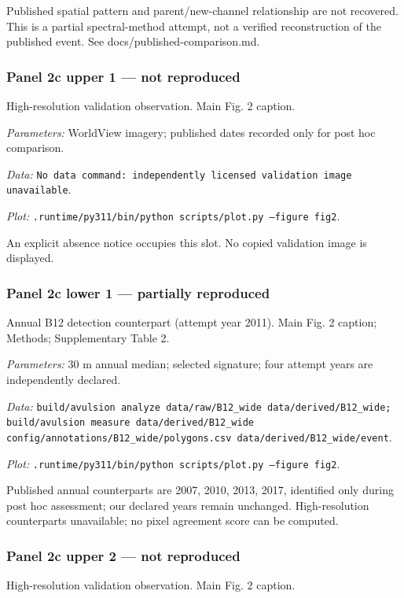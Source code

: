 Published spatial pattern and parent/new-channel relationship are not recovered. This is a partial spectral-method attempt, not a verified reconstruction of the published event. See docs/published-comparison.md.

\subsubsection*{Panel 2c upper 1 --- not reproduced}
High-resolution validation observation. Main Fig. 2 caption.

\textit{Parameters:} WorldView imagery; published dates recorded only for post hoc comparison.

\textit{Data:} \texttt{No data command: independently licensed validation image unavailable}.

\textit{Plot:} \texttt{.runtime/\allowbreak{}py311/\allowbreak{}bin/\allowbreak{}python scripts/\allowbreak{}plot.py --figure fig2}.

An explicit absence notice occupies this slot. No copied validation image is displayed.

\subsubsection*{Panel 2c lower 1 --- partially reproduced}
Annual B12 detection counterpart (attempt year 2011). Main Fig. 2 caption; Methods; Supplementary Table 2.

\textit{Parameters:} 30 m annual median; selected signature; four attempt years are independently declared.

\textit{Data:} \texttt{build/\allowbreak{}avulsion analyze data/\allowbreak{}raw/\allowbreak{}B12\_wide data/\allowbreak{}derived/\allowbreak{}B12\_wide; build/\allowbreak{}avulsion measure data/\allowbreak{}derived/\allowbreak{}B12\_wide config/\allowbreak{}annotations/\allowbreak{}B12\_wide/\allowbreak{}polygons.csv data/\allowbreak{}derived/\allowbreak{}B12\_wide/\allowbreak{}event}.

\textit{Plot:} \texttt{.runtime/\allowbreak{}py311/\allowbreak{}bin/\allowbreak{}python scripts/\allowbreak{}plot.py --figure fig2}.

Published annual counterparts are 2007, 2010, 2013, 2017, identified only during post hoc assessment; our declared years remain unchanged. High-resolution counterparts unavailable; no pixel agreement score can be computed.

\subsubsection*{Panel 2c upper 2 --- not reproduced}
High-resolution validation observation. Main Fig. 2 caption.

